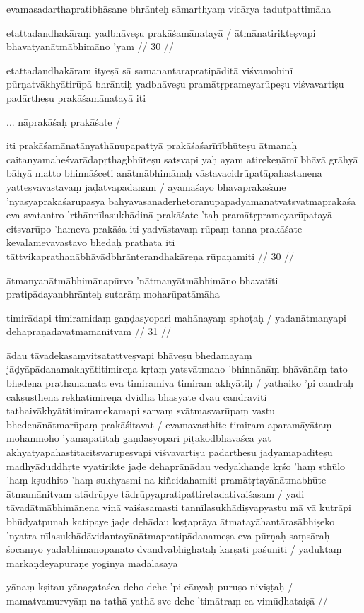 evamasadarthapratibhāsane bhrānteḥ sāmarthyaṃ vicārya tadutpattimāha

etattadandhakāraṃ yadbhāveṣu prakāśamānatayā  /
ātmānatirikteṣvapi bhavatyanātmābhimāno 'yam  // 30  //

etattadandhakāram ityeṣā sā samanantarapratipāditā viśvamohinī pūrṇatvākhyātirūpā bhrāntiḥ yadbhāveṣu pramātṛprameyarūpeṣu viśvavartiṣu padārtheṣu prakāśamānatayā iti

... nāprakāśaḥ prakāśate  /

iti prakāśamānatānyathānupapattyā prakāśaśarīrībhūteṣu ātmanaḥ caitanyamaheśvarādapṛthagbhūteṣu satsvapi yaḥ ayam atirekeṇāmī bhāvā grāhyā bāhyā matto bhinnāśceti anātmābhimānaḥ vāstavacidrūpatāpahastanena yatteṣvavāstavaṃ jaḍatvāpādanam  / ayamāśayo bhāvaprakāśane 'nyasyāprakāśarūpasya bāhyavāsanāderhetoranupapadyamānatvātsvātmaprakāśa eva svatantro 'rthānnīlasukhādinā prakāśate 'taḥ pramātṛprameyarūpatayā citsvarūpo 'hameva prakāśa iti yadvāstavaṃ rūpaṃ tanna prakāśate kevalamevāvāstavo bhedaḥ prathata iti tāttvikaprathanābhāvādbhrānterandhakāreṇa rūpaṇamiti  // 30  //

ātmanyanātmābhimānapūrvo 'nātmanyātmābhimāno bhavatīti pratipādayanbhrānteḥ sutarāṃ moharūpatāmāha

timirādapi timiramidaṃ gaṇḍasyopari mahānayaṃ sphoṭaḥ  /
yadanātmanyapi dehaprāṇādāvātmamānitvam  // 31  //

ādau tāvadekasaṃvitsatattveṣvapi bhāveṣu bhedamayaṃ jāḍyāpādanamakhyātitimireṇa kṛtaṃ yatsvātmano 'bhinnānāṃ bhāvānāṃ tato bhedena prathanamata eva timiramiva timiram akhyātiḥ  / yathaiko 'pi candraḥ cakṣusthena rekhātimireṇa dvidhā bhāsyate dvau candrāviti tathaivākhyātitimiramekamapi sarvaṃ svātmasvarūpaṃ vastu bhedenānātmarūpaṃ prakāśitavat  / evamavasthite timiram aparamāyātaṃ mohānmoho 'yamāpatitaḥ gaṇḍasyopari piṭakodbhavaśca yat akhyātyapahastitacitsvarūpeṣvapi viśvavartiṣu padārtheṣu jāḍyamāpāditeṣu madhyāduddhṛte vyatirikte jaḍe dehaprāṇādau vedyakhaṇḍe kṛśo 'haṃ sthūlo 'haṃ kṣudhito 'haṃ sukhyasmi na kiñcidahamiti pramātṛtayānātmabhūte ātmamānitvam atādrūpye tādrūpyapratipattiretadativaiśasam  / yadi tāvadātmābhimānena vinā vaiśasamasti tannīlasukhādiṣvapyastu mā vā kutrāpi bhūdyatpunaḥ katipaye jaḍe dehādau loṣṭaprāya ātmatayāhantārasābhiṣeko 'nyatra nīlasukhādāvidantayānātmapratipādanameṣa eva pūrṇaḥ saṃsāraḥ śocanīyo yadabhimānopanato dvandvābhighātaḥ karṣati paśūniti  / yaduktaṃ mārkaṇḍeyapurāṇe yoginyā madālasayā

yānaṃ kṣitau yānagataśca deho dehe 'pi cānyaḥ puruṣo niviṣṭaḥ  /
mamatvamurvyāṃ na tathā yathā sve dehe 'timātraṃ ca vimūḍhataiṣā  //

